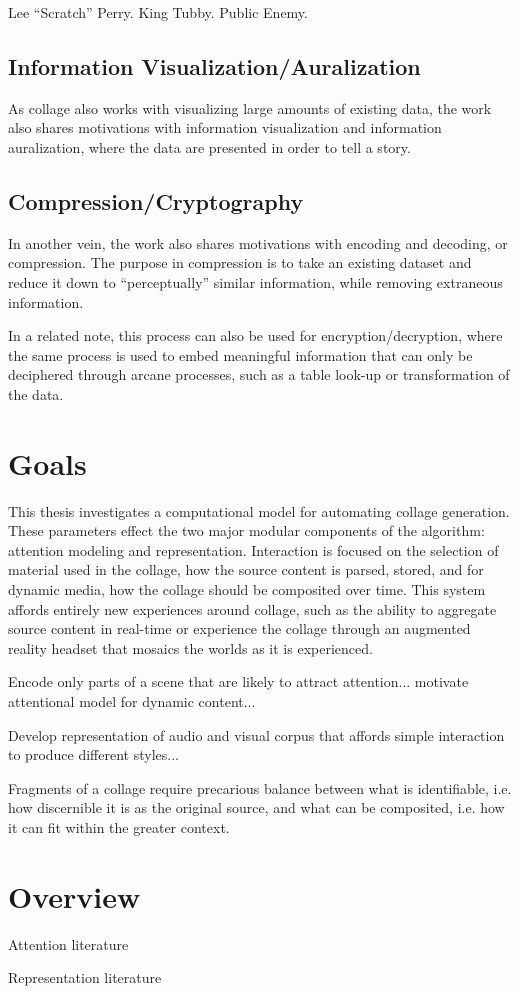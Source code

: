 Lee ``Scratch'' Perry.  King Tubby.  Public Enemy. 

\subsection{Information Visualization/Auralization}
As collage also works with visualizing large amounts of existing data, the work also shares motivations with information visualization and information auralization, where the data are presented in order to tell a story.  

\subsection{Compression/Cryptography}
In another vein, the work also shares motivations with encoding and decoding, or compression.  The purpose in compression is to take an existing dataset and reduce it down to ``perceptually'' similar information, while removing extraneous information.  

In a related note, this process can also be used for encryption/decryption, where the same process is used to embed meaningful information that can only be deciphered through arcane processes, such as a table look-up or transformation of the data.  

\section{Goals}

This thesis investigates a computational model for automating collage generation.  These parameters effect the two major modular components of the algorithm: attention modeling and representation.   Interaction is focused on the selection of material used in the collage, how the source content is parsed, stored, and for dynamic media, how the collage should be composited over time.  This system affords entirely new experiences around collage, such as the ability to aggregate source content in real-time or experience the collage through an augmented reality headset that mosaics the worlds as it is experienced.  

Encode only parts of a scene that are likely to attract attention... motivate attentional model for dynamic content... 

Develop representation of audio and visual corpus that affords simple interaction to produce different styles...

Fragments of a collage require precarious balance between what is identifiable, i.e. how discernible it is as the original source, and what can be composited, i.e. how it can fit within the greater context. 

\section{Overview}
Attention literature

Representation literature
